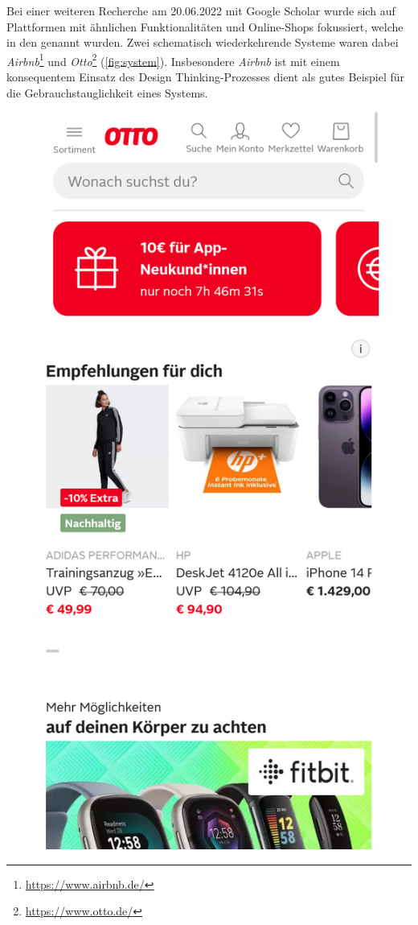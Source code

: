 Bei einer weiteren Recherche am 20.06.2022 mit Google Scholar wurde sich auf Plattformen mit
ähnlichen Funktionalitäten und Online-Shops fokussiert, welche in den 
genannt wurden. Zwei schematisch wiederkehrende Systeme waren dabei
\textit{Airbnb}\footnote{\url{https://www.airbnb.de/}} und
\textit{Otto}\footnote{\url{https://www.otto.de/}} (\ref{fig:system}). Insbesondere \textit{Airbnb}
ist mit einem konsequentem Einsatz des Design Thinking-Prozesses dient als gutes Beispiel für die
Gebrauchstauglichkeit eines Systems\cite{glitza_hands_2019}.

\begin{figure}[h]
        \centering
        \includegraphics[scale=0.1]{Bilder/otto.png}\hspace{1em}

\end{figure}

